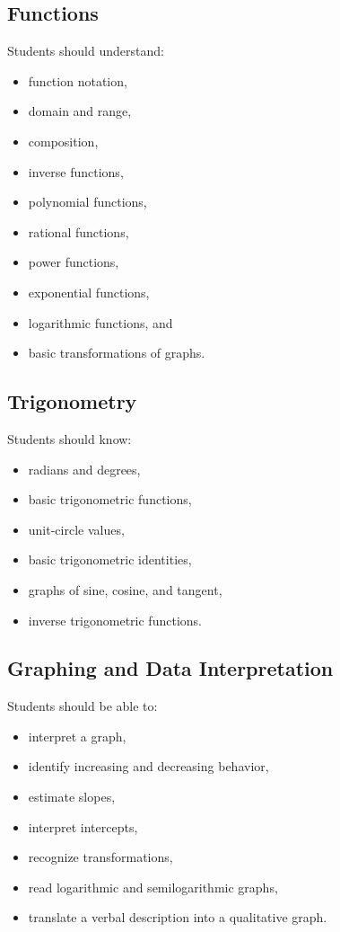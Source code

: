 \documentclass[11pt]{article}
\begin{document}
\subsection{Functions}

Students should understand:

\begin{itemize}
    \item function notation,
    \item domain and range,
    \item composition,
    \item inverse functions,
    \item polynomial functions,
    \item rational functions,
    \item power functions,
    \item exponential functions,
    \item logarithmic functions, and
    \item basic transformations of graphs.
\end{itemize}

\subsection{Trigonometry}

Students should know:

\begin{itemize}
    \item radians and degrees,
    \item basic trigonometric functions,
    \item unit-circle values,
    \item basic trigonometric identities,
    \item graphs of sine, cosine, and tangent,
    \item inverse trigonometric functions.
\end{itemize}

\subsection{Graphing and Data Interpretation}

Students should be able to:

\begin{itemize}
    \item interpret a graph,
    \item identify increasing and decreasing behavior,
    \item estimate slopes,
    \item interpret intercepts,
    \item recognize transformations,
    \item read logarithmic and semilogarithmic graphs,
    \item translate a verbal description into a qualitative graph.
\end{itemize}
\end{document}
